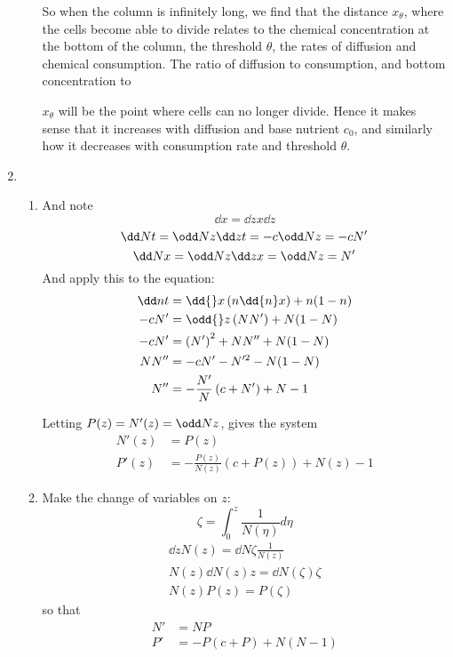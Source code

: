 \documentclass{X:/Documents/Coding/Latex/myassignment}
\begin{document}
\begin{enumerate}
\begin{enumerate}
		So when the column is infinitely long, we find that the distance $x_\theta$, where the cells become able to divide relates to the chemical concentration at the bottom of the column, the threshold $\theta$, the rates of diffusion and chemical consumption.  The ratio of diffusion to consumption, and bottom concentration to 

		$x_{\theta}$ will be the point where cells can no longer divide. Hence it makes sense that it increases with diffusion and base nutrient $c_0$, and similarly how it decreases with consumption rate and threshold $\theta$.

	\end{enumerate}
	\item 
	\begin{enumerate}
		\item 
		And note
		\[\dd{}x = \dd{z}{x} \dd{}z\]
		\[\dd Nt = \odd Nz \dd z t = -c\odd Nz = -cN'  \]
		\[\dd Nx = \odd Nz \dd z x = \odd Nz = N'\]
		And apply this to the equation:
		\begin{align*}
		\dd nt &= \dd{}x\left(n\dd{n}x\right) +  n(1-n)\\
		-c N' &= \odd{}z\left(NN'\right) + N(1-N)\\
		-c N' &= \left(N' \right)^2 + N N'' + N(1-N)\\
		N N'' &= -cN' - N'^2  - N(1-N)\\
		N'' &= -\frac{N'}{N} \left(c + N'\right) + N-1
		\end{align*}
		

		Letting $P(z) = N'(z) = \odd Nz$, gives the system
		\begin{align*}
			N'(z) &= P(z)\\
			P'(z) &= - \frac{P(z)}{N(z)} \left(c + P(z)\right) + N(z) - 1
		\end{align*}

		\item Make the change of variables on $z$:
		\[\zeta = \int_0^z \frac{1}{N(\eta)} d \eta\]
		\begin{align*}
			\dd{}z N(z) = \dd{N}\zeta \frac{1}{N(z)}\\
			N(z) \dd{N(z)}z  = \dd{N(\zeta)}\zeta\\
			N(z) P(z) = P(\zeta)
		\end{align*}
		so that 
		\begin{align*}
			N' &= NP\\
			P' &= - P\left(c + P\right) + N(N - 1)
		\end{align*}


\end{enumerate}
\end{enumerate}
\end{document}
